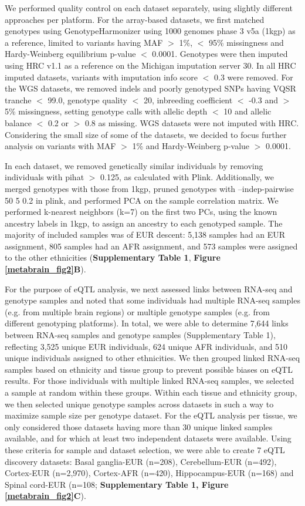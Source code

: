 We performed quality control on each dataset separately, using slightly different approaches per platform. For the array-based datasets, we first matched genotypes using GenotypeHarmonizer\cite{deelenGenotypeHarmonizerAutomatic2014} using 1000 genomes phase 3 v5a (1kgp) as a reference, limited to variants having MAF $>$ 1\%, $<$ 95\% missingness and Hardy-Weinberg equilibrium p-value $<$ 0.0001. Genotypes were then imputed using HRC v1.1 as a reference on the Michigan imputation server 30. In all HRC imputed datasets, variants with imputation info score $<$ 0.3 were removed. For the WGS datasets, we removed indels and poorly genotyped SNPs having VQSR tranche $<$ 99.0, genotype quality $<$ 20, inbreeding coefficient $<$ -0.3 and $>$ 5\% missingness, setting genotype calls with allelic depth $<$ 10 and allelic balance $<$ 0.2 or $>$ 0.8 as missing. WGS datasets were not imputed with HRC. Considering the small size of some of the datasets, we decided to focus further analysis on variants with MAF $>$ 1\% and Hardy-Weinberg p-value $>$ 0.0001. 

In each dataset, we removed genetically similar individuals by removing individuals with pihat $>$ 0.125, as calculated with Plink. Additionally, we merged genotypes with those from 1kgp, pruned genotypes with --indep-pairwise 50 5 0.2 in plink, and performed PCA on the sample correlation matrix. We performed k-nearest neighbors (k=7) on the first two PCs, using the known ancestry labels in 1kgp, to assign an ancestry to each genotyped sample. The majority of included samples was of EUR descent: 5,138 samples had an EUR assignment, 805 samples had an AFR assignment, and 573 samples were assigned to the other ethnicities (\textbf{Supplementary Table 1}, \textbf{Figure \ref{metabrain_fig2}B}). 

For the purpose of eQTL analysis, we next assessed links between RNA-seq and genotype samples and noted that some individuals had multiple RNA-seq samples (e.g. from multiple brain regions) or multiple genotype samples (e.g. from different genotyping platforms). In total, we were able to determine 7,644 links between RNA-seq samples and genotype samples (Supplementary Table 1), reflecting 3,525 unique EUR individuals, 624 unique AFR individuals, and 510 unique individuals assigned to other ethnicities. We then grouped linked RNA-seq samples based on ethnicity and tissue group to prevent possible biases on eQTL results. For those individuals with multiple linked RNA-seq samples, we selected a sample at random within these groups. Within each tissue and ethnicity group, we then selected unique genotype samples across datasets in such a way to maximize sample size per genotype dataset. For the eQTL analysis per tissue, we only considered those datasets having more than 30 unique linked samples available, and for which at least two independent datasets were available. Using these criteria for sample and dataset selection, we were able to create 7 eQTL discovery datasets: Basal ganglia-EUR (n=208), Cerebellum-EUR (n=492), Cortex-EUR (n=2,970), Cortex-AFR (n=420), Hippocampus-EUR (n=168) and Spinal cord-EUR (n=108; \textbf{Supplementary Table 1, Figure \ref{metabrain_fig2}C}). 


